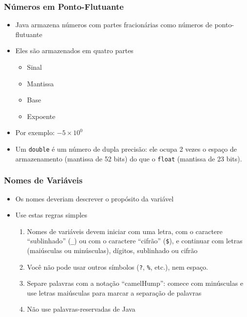 \documentclass[xcolor={dvipsnames,table},aspectratio=169]{beamer}
\begin{document}
\begin{frame}\frametitle{Números em Ponto-Flutuante}
\begin{itemize}
	\item Java armazena números com partes fracionárias como números de ponto-flutuante
	\item Eles são armazenados em quatro partes
	\begin{itemize}
		\item Sinal
		\item Mantissa
		\item Base
		\item Expoente
	\end{itemize}
	\item Por exemplo: $-5 \times 10^{0}$
	\item Um \texttt{double} é um número de dupla precisão: ele ocupa 2 vezes o espaço de armazenamento (mantissa de 52 bits) do que o \texttt{float} (mantissa de 23 bits).
\end{itemize}
\end{frame}

\begin{frame}\frametitle{Nomes de Variáveis}
\begin{itemize}
	\item Os nomes deveriam descrever o propósito da variável
	\item Use estas regras simples
	\begin{enumerate}
		\item Nomes de variáveis devem iniciar com uma letra, com o caractere ``sublinhado'' (\texttt{\_}) ou com o caractere ``cifrão'' (\texttt{\$}), e continuar com letras (maiúsculas ou minúsculas), dígitos, sublinhado ou cifrão
		\item Você não pode usar outros símbolos (\texttt{?}, \texttt{\%}, etc.), nem espaço.
		\item Separe palavras com a notação ``camelHump'': comece com minúsculas e use letras maiúsculas para marcar a separação de palavras
		\item Não use palavras-reservadas de Java
	\end{enumerate}
\end{itemize}
\end{frame}
\end{document}

